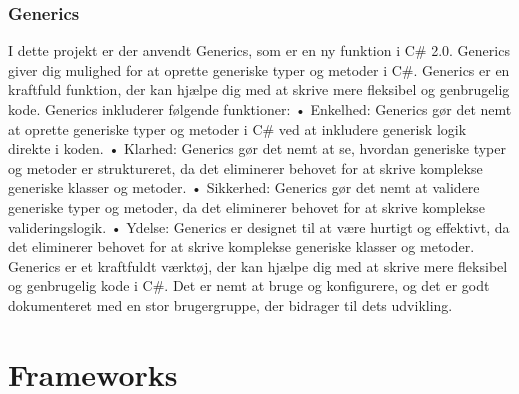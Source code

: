 \subsubsection{Generics}
I dette projekt er der anvendt Generics, som er en ny funktion i C\# 2.0. Generics giver dig mulighed for at oprette generiske typer og metoder i C#. Generics er en kraftfuld funktion, der kan hjælpe dig med at skrive mere fleksibel og genbrugelig kode.
Generics inkluderer følgende funktioner:
•	Enkelhed: Generics gør det nemt at oprette generiske typer og metoder i C# ved at inkludere generisk logik direkte i koden.
•	Klarhed: Generics gør det nemt at se, hvordan generiske typer og metoder er struktureret, da det eliminerer behovet for at skrive komplekse generiske klasser og metoder.
•	Sikkerhed: Generics gør det nemt at validere generiske typer og metoder, da det eliminerer behovet for at skrive komplekse valideringslogik.
•	Ydelse: Generics er designet til at være hurtigt og effektivt, da det eliminerer behovet for at skrive komplekse generiske klasser og metoder.
Generics er et kraftfuldt værktøj, der kan hjælpe dig med at skrive mere fleksibel og genbrugelig kode i C#. Det er nemt at bruge og konfigurere, og det er godt dokumenteret med en stor brugergruppe, der bidrager til dets udvikling.

\section{Frameworks}


